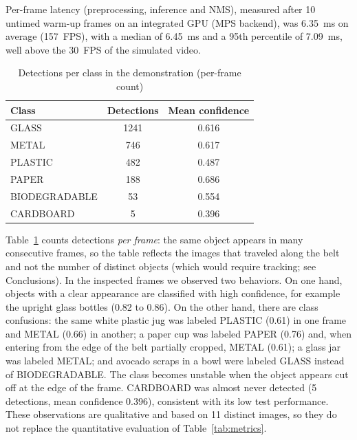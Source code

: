 \documentclass[conference]{IEEEtran}
\begin{document}
Per-frame latency (preprocessing, inference and NMS), measured after 10 untimed warm-up frames
on an integrated GPU (MPS backend), was 6.35~ms on average (157~FPS), with
a median of 6.45~ms and a 95th percentile of 7.09~ms, well above the 30~FPS of the simulated
video.

\begin{table}[htbp]
\caption{Detections per class in the demonstration (per-frame count)}
\begin{center}
\begin{tabular}{lcc}
\toprule
\textbf{Class} & \textbf{Detections} & \textbf{Mean confidence} \\
\midrule
GLASS         & 1241 & 0.616 \\
METAL         &  746 & 0.617 \\
PLASTIC       &  482 & 0.487 \\
PAPER         &  188 & 0.686 \\
BIODEGRADABLE &   53 & 0.554 \\
CARDBOARD     &    5 & 0.396 \\
\bottomrule
\end{tabular}
\label{tab:demo}
\end{center}
\end{table}

Table~\ref{tab:demo} counts detections \emph{per frame}: the same object appears in many
consecutive frames, so the table reflects the images that traveled along the belt and not the
number of distinct objects (which would require tracking; see Conclusions). In the inspected
frames we observed two behaviors. On one hand, objects with a clear appearance are classified
with high confidence, for example the upright glass bottles (0.82 to 0.86). On the other hand,
there are class confusions: the same white plastic jug was labeled PLASTIC (0.61) in one frame
and METAL (0.66) in another; a paper cup was labeled PAPER (0.76) and, when entering from the
edge of the belt partially cropped, METAL (0.61); a glass jar was labeled METAL; and avocado
scraps in a bowl were labeled GLASS instead of BIODEGRADABLE. The class becomes unstable when
the object appears cut off at the edge of the frame. CARDBOARD was almost never detected (5
detections, mean confidence 0.396), consistent with its low test performance. These
observations are qualitative and based on 11 distinct images, so they do not replace the
quantitative evaluation of Table~\ref{tab:metrics}.
\end{document}
